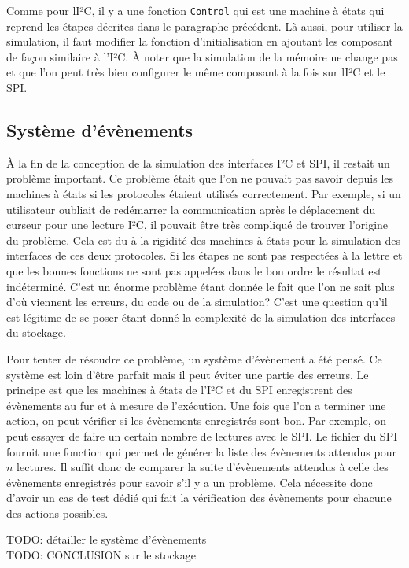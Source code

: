 \documentclass[a4paper]{article}
\begin{document}
Comme pour lI²C, il y a une fonction \verb|Control| qui est une machine à états
qui reprend les étapes décrites dans le paragraphe précédent. Là aussi, pour
utiliser la simulation, il faut modifier la fonction d'initialisation en
ajoutant les composant de façon similaire à l'I²C. À noter que la simulation de
la mémoire ne change pas et que l'on peut très bien configurer le même composant
à la fois sur lI²C et le SPI.
\subsection{Système d'évènements}%

À la fin de la conception de la simulation des interfaces I²C et SPI, il restait
un problème important. Ce problème était que l'on ne pouvait pas savoir depuis
les machines à états si les protocoles étaient utilisés correctement. Par
exemple, si un utilisateur oubliait de redémarrer la communication après le
déplacement du curseur pour une lecture I²C, il pouvait être très compliqué de
trouver l'origine du problème. Cela est du à la rigidité des machines à états
pour la simulation des interfaces de ces deux protocoles. Si les étapes ne sont
pas respectées à la lettre et que les bonnes fonctions ne sont pas appelées
dans le bon ordre le résultat est indéterminé. C'est un énorme problème étant
donnée le fait que l'on ne sait plus d'où viennent les erreurs, du code ou de la
simulation? C'est une question qu'il est légitime de se poser étant donné la
complexité de la simulation des interfaces du stockage.

Pour tenter de résoudre ce problème, un système d'évènement a été pensé. Ce
système est loin d'être parfait mais il peut éviter une partie des erreurs. Le
principe est que les machines à états de l'I²C et du SPI enregistrent des
évènements au fur et à mesure de l'exécution. Une fois que l'on a terminer une
action, on peut vérifier si les évènements enregistrés sont bon. Par exemple, on
peut essayer de faire un certain nombre de lectures avec le SPI. Le fichier du
SPI fournit une fonction qui permet de générer la liste des évènements attendus
pour $n$ lectures. Il suffit donc de comparer la suite d'évènements attendus à
celle des évènements enregistrés pour savoir s'il y a un problème. Cela
nécessite donc d'avoir un cas de test dédié qui fait la vérification des
évènements pour chacune des actions possibles.

TODO: détailler le système d'évènements
\\
TODO: CONCLUSION sur le stockage
\end{document}
